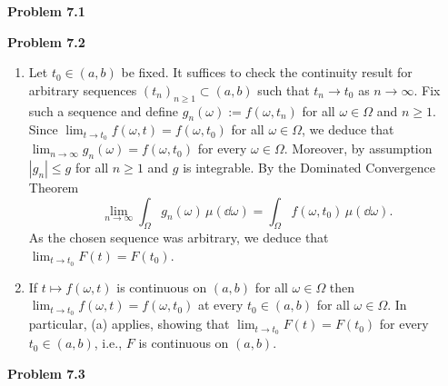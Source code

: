    
\textbf{Problem 7.1}

\bigskip

\textbf{Problem 7.2}

\begin{enumerate}[label={(\alph*)}]
	\item Let $t_0\in (a,b)$ be fixed. It suffices to check the continuity result for arbitrary sequences $(t_n)_{n\ge 1} \subset (a, b)$ such that $t_n\to t_0$ as $n\to\infty$. Fix such a sequence and define $g_n(\omega):= f(\omega,t_n)$ for all $\omega\in\Omega$ and $n\ge 1$. Since $\lim_{t\to t_0}f(\omega,t)=f(\omega,t_0)$ for all $\omega\in\Omega$, we deduce that $\lim_{n\to\infty} g_n(\omega) = f(\omega,t_0)$ for every $\omega\in\Omega$. Moreover, by assumption $|g_n| \le g$ for all $n \ge 1$ and $g$ is integrable. By the Dominated Convergence Theorem
\[
	\lim_{n\to\infty} \int_\Omega g_n(\omega)\,\mu(\dd\omega) = \int_\Omega f(\omega,t_0)\,\mu(\dd\omega).
\]
As the chosen sequence was arbitrary, we deduce that $\lim_{t\to t_0} F(t) = F(t_0)$.

	\item If $t\mapsto f(\omega,t)$ is continuous on $(a, b)$ for all $\omega\in\Omega$ then $\lim_{t\to t_0}f(\omega,t)=f(\omega,t_0)$ at every $t_0\in(a,b)$ for all $\omega\in\Omega$. In particular, (a) applies, showing that $\lim_{t\to t_0} F(t) = F(t_0)$ for every $t_0\in (a,b)$, i.e., $F$ is continuous on $(a, b)$.
\end{enumerate}

\bigskip

\textbf{Problem 7.3}

